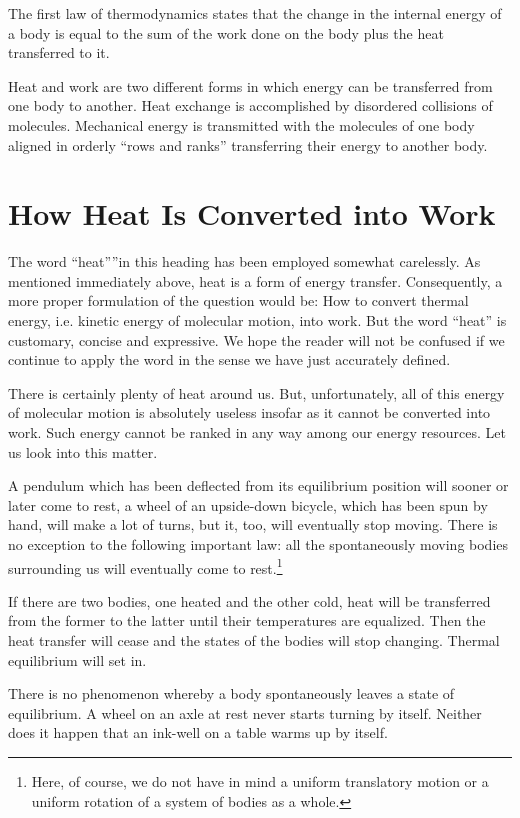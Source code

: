 The first law of thermodynamics states that the change in the internal energy of a body is equal to the sum of the work done on the body plus the heat transferred to it.

Heat and work are two different forms in which energy can be transferred from one body to another. Heat exchange is accomplished by disordered collisions of molecules. Mechanical energy is transmitted with the mole­cules of one body aligned in orderly ``rows and ranks'' transferring their energy to another body.

\section{How Heat Is Converted into Work}

The word ``heat''”in this heading has been employed somewhat carelessly. As mentioned immediately above, heat is a form of energy transfer. Consequently, a more proper formulation of the question would be: How to convert thermal energy, i.e. kinetic energy of molecular motion, into work. But the word ``heat'' is customary, concise and expressive. We hope the reader will not be confused if we continue to apply the word in the sense we have just accurately defined.

There is certainly plenty of heat around us. But, unfortunately, all of this energy of molecular motion is ab­solutely useless insofar as it cannot be converted into work. Such energy cannot be ranked in any way among our energy resources. Let us look into this matter.

A pendulum which has been deflected from its equilib­rium position will sooner or later come to rest, a wheel of an upside-down bicycle, which has been spun by hand, will make a lot of turns, but it, too, will eventually stop moving. There is no exception to the following important law: all the spontaneously moving bodies surrounding us will eventually come to rest.\footnote{Here, of course, we do not have in mind a uniform translatory motion or a uniform rotation of a system of bodies as a whole.}

If there are two bodies, one heated and the other cold, heat will be transferred from the former to the latter until their temperatures are equalized. Then the heat trans­fer will cease and the states of the bodies will stop changing. Thermal equilibrium will set in.

There is no phenomenon whereby a body spontaneous­ly leaves a state of equilibrium. A wheel on an axle at rest never starts turning by itself. Neither does it happen that an ink-well on a table warms up by itself.

